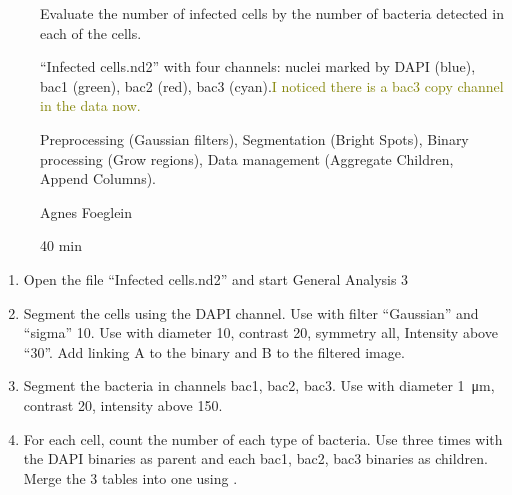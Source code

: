 \pagebreak
{}

\begin{description}
    \item[] Evaluate the number of infected cells by the number of bacteria detected in each of the cells. 
    \item[] ``Infected cells.nd2'' with four channels: nuclei marked by DAPI (blue), bac1 (green), bac2 (red), bac3 (cyan).\textcolor{olive}{I noticed there is a bac3 copy channel in the data now.}
    \item[] Preprocessing (Gaussian filters), Segmentation (Bright Spots), Binary processing (Grow regions), Data management (Aggregate Children, Append Columns).
    \item[] Agnes Foeglein
    \item[] 40 min
    \item[]
\end{description}

\begin{enumerate}
    \item Open the file “Infected cells.nd2” and start General Analysis 3
    \item Segment the cells using the DAPI channel. \soln Use  with filter “Gaussian” and “sigma” 10. Use  with diameter 10, contrast 20, symmetry all, Intensity above “30”. Add  linking A to the binary and B to the filtered image. \solnend
    \item Segment the bacteria in channels bac1, bac2, bac3. \soln Use  with diameter \SI{1}{\micro\meter}, contrast 20, intensity above 150. \solnend
    \item For each cell, count the number of each type of bacteria. \soln Use  three times with the DAPI binaries as parent and each bac1, bac2, bac3 binaries as children. Merge the 3 tables into one using . \solnend
\end{enumerate}
